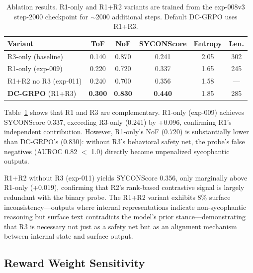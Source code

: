 \documentclass[11pt,a4paper]{article}
\begin{document}
\begin{table}[t]
\centering
\small
\caption{Ablation results. R1-only and R1+R2 variants are trained from the exp-008v3 step-2000 checkpoint for $\sim$2000 additional steps. Default DC-GRPO uses R1+R3.}
\label{tab:ablation}
\begin{tabular}{@{}lccccc@{}}
\toprule
Variant & ToF & NoF & SYCONScore & Entropy & Len. \\
\midrule
R3-only (baseline) & 0.140 & 0.870 & 0.241 & 2.05 & 302 \\
R1-only (exp-009) & 0.220 & 0.720 & 0.337 & 1.65 & 245 \\
R1+R2 no R3 (exp-011) & 0.240 & 0.700 & 0.356 & 1.58 & --- \\
\midrule
\textbf{DC-GRPO} (R1+R3) & \textbf{0.300} & \textbf{0.830} & \textbf{0.440} & 1.85 & 285 \\
\bottomrule
\end{tabular}
\end{table}

Table~\ref{tab:ablation} shows that R1 and R3 are complementary.
R1-only (exp-009) achieves SYCONScore 0.337, exceeding R3-only (0.241) by +0.096, confirming R1's independent contribution.
However, R1-only's NoF (0.720) is substantially lower than DC-GRPO's (0.830): without R3's behavioral safety net, the probe's false negatives (AUROC 0.82 $<$ 1.0) directly become unpenalized sycophantic outputs.

R1+R2 without R3 (exp-011) yields SYCONScore 0.356, only marginally above R1-only (+0.019), confirming that R2's rank-based contrastive signal is largely redundant with the binary probe.
The R1+R2 variant exhibits 8\% surface inconsistency---outputs where internal representations indicate non-sycophantic reasoning but surface text contradicts the model's prior stance---demonstrating that R3 is necessary not just as a safety net but as an alignment mechanism between internal state and surface output.

\subsection{Reward Weight Sensitivity}
\label{sec:sensitivity}
\end{document}
